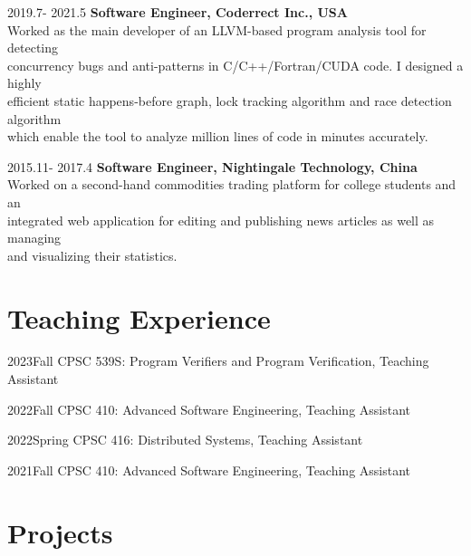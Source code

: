 \documentclass[12pt,letterpaper]{report}
\newcommand{\listtabwidth}{1.75cm}
\begin{document}
\begin{tablist}[style=multiline, leftmargin=*]
	\item[2019.7- 2021.5]
	\tab \textbf{Software Engineer, Coderrect Inc., USA}\\
	\tab Worked as the main developer of an LLVM-based program analysis tool for detecting\\
	\tab concurrency bugs and anti-patterns in C/C++/Fortran/CUDA code. I designed a highly\\
	\tab efficient static happens-before graph, lock tracking algorithm and race detection algorithm\\
	\tab which enable the tool to analyze million lines of code in minutes accurately.
	\item[2015.11- 2017.4]
	\tab \textbf{Software Engineer, Nightingale Technology, China}\\
	\tab Worked on a second-hand commodities trading platform for college students and an\\
	\tab integrated web application for editing and publishing news articles as well as managing\\
	\tab and visualizing their statistics.
\end{tablist}

\section*{Teaching Experience}
\renewcommand{\listtabwidth}{2.5cm}
\begin{tablist}
	\item[2023Fall] \tab CPSC 539S: Program Verifiers and Program Verification, Teaching Assistant
	\item[2022Fall] \tab CPSC 410: Advanced Software Engineering, Teaching Assistant
	\item[2022Spring] \tab CPSC 416: Distributed Systems, Teaching Assistant
	\item[2021Fall] \tab CPSC 410: Advanced Software Engineering, Teaching Assistant
\end{tablist}
\renewcommand{\listtabwidth}{1.75cm}

\vspace{-0.5em}

\renewcommand{\listtabwidth}{2.5cm}
\section*{Projects}
\end{document}
